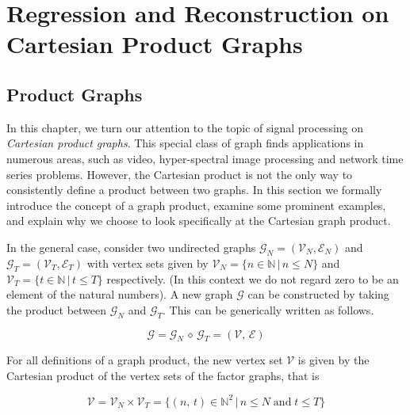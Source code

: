 \chapter{Regression and Reconstruction on Cartesian Product Graphs} 

\label{chap:reg_and_rec} 




\section{Product Graphs}

\label{sec:reg_and_rec_intro}

In this chapter, we turn our attention to the topic of signal processing on \textit{Cartesian product graphs}. This special class of graph finds applications in numerous areas, such as video, hyper-spectral image processing and network time series problems. However, the Cartesian product is not the only way to consistently define a product between two graphs. In this section we formally introduce the concept of a graph product, examine  some prominent examples, and explain why we choose to look specifically at the Cartesian graph product. 

In the general case, consider two undirected graphs $\mathcal{G}_N = (\mathcal{V}_N, \mathcal{E}_N)$ and $\mathcal{G}_T = (\mathcal{V}_T, \mathcal{E}_T)$ with vertex sets given by $\mathcal{V}_N = \{n \in \mathbb{N} \, | \, n \leq N \}$ and $\mathcal{V}_T = \{t \in \mathbb{N} \, | \, t \leq T \}$ respectively. (In this context we do not regard zero to be an element of the natural numbers). A new graph $\mathcal{G}$ can be constructed by taking the product between $\mathcal{G}_N$ and $\mathcal{G}_T$. This can be generically written as follows. 

\begin{equation}
    \mathcal{G} = \mathcal{G}_N \, \diamond \, \mathcal{G}_T = (\mathcal{V}, \, \mathcal{E})
\end{equation}

For all definitions of a graph product, the new vertex set $\mathcal{V}$ is given by the Cartesian product of the vertex sets of the factor graphs, that is

\begin{equation}
    \mathcal{V} = \mathcal{V}_N \times \mathcal{V}_T = \{(n, \, t) \in \mathbb{N}^2 \, | \, n \leq N \; \text{and} \; t \leq T \}
\end{equation}

